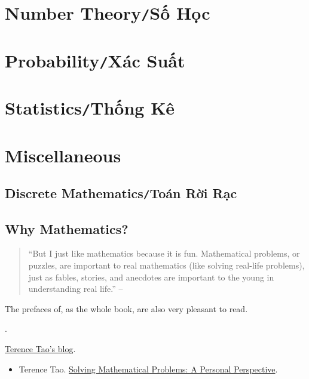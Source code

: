 \documentclass{article}
\numberwithin{equation}{section}
\begin{document}
\section{Number Theory\texttt{/}Số Học}

\section{Probability\texttt{/}Xác Suất}

\section{Statistics\texttt{/}Thống Kê}

\section{Miscellaneous}

\subsection{Discrete Mathematics\texttt{/}Toán Rời Rạc}

\subsection{Why Mathematics?}
\begin{quotation}
	``But I just like mathematics because it is fun. Mathematical problems, or puzzles, are important to real mathematics (like solving real-life problems), just as fables, stories, and anecdotes are important to the young in understanding real life.'' -- \cite[Preface, p. viii]{Tao2006}
\end{quotation}
The prefaces of, as the whole book, \cite{Tao2006} are also very pleasant to read.

\cite{Polya2014}.


\begin{thebibliography}{99}
	 \href{https://terrytao.wordpress.com}{Terence Tao's blog}.
	\begin{itemize}
		\item Terence Tao. \href{https://terrytao.wordpress.com/books/solving-mathematical-problems-a-personal-perspective/}{Solving Mathematical Problems: A Personal Perspective}.
	\end{itemize}
\end{thebibliography}

\printbibliography[heading=bibintoc]
\end{document}
